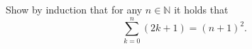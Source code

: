 Show by induction that for any $n \in \mathbb{N}$ it holds that
$$
	\sum_{k=0}^n \left(2k+1\right) = (n+1)^2.
$$